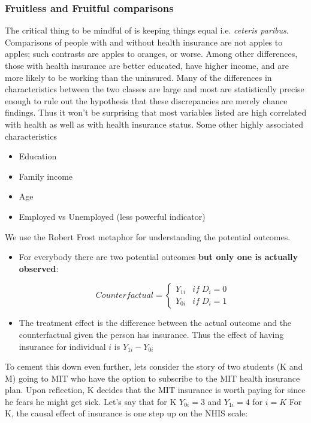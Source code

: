 \documentclass[12pt, letterpaper]{article}
\begin{document}
{\subsubsection{Fruitless and Fruitful comparisons}
The critical thing to be mindful of is keeping things equal i.e. \textit{ceteris paribus}. Comparisons of people with and without health insurance are not apples to apples; such contrasts are apples to oranges, or worse. Among other differences, those with health insurance are better educated, have higher income, and are more likely to be working than the uninsured. Many of the differences in characteristics between the two classes are large and most are statistically precise enough to rule out the hypothesis that these discrepancies are merely chance findings. Thus it won't be surprising that most variables listed are high correlated with health as well as with health insurance status. Some other highly associated characteristics
\begin{itemize}
	\item Education
	\item Family income
	\item Age
	\item Employed vs Unemployed (less powerful indicator)
\end{itemize}
We use the Robert Frost metaphor for understanding the potential outcomes.
\begin{itemize}
		\item For everybody there are two potential outcomes \textbf{but only one is actually observed}:
	\begin{center}
		\[ Counterfactual =
		\begin{cases}
		Y_{1i} & if \; D_i = 0\\
		Y_{0i} & if \; D_i = 1
		\end{cases}
		\]
	\end{center}
	\item The treatment effect is the difference between the actual outcome and the counterfactual given the person has insurance. Thus the effect of having insurance for individual $i$ is $Y_{1i} - Y_{0i}$
\end{itemize}
To cement this down even further, lets consider the story of two students (K and M) going to MIT who have the option to subscribe to the MIT health insurance plan. Upon reflection, K decides that the MIT insurance is worth paying for since he fears he might get sick. Let's say that for K $Y_{0i} = 3$ and $Y_{1i} = 4$ for $i = K$ For K, the causal effect of insurance is one step up on the NHIS scale:
}
\end{document}
